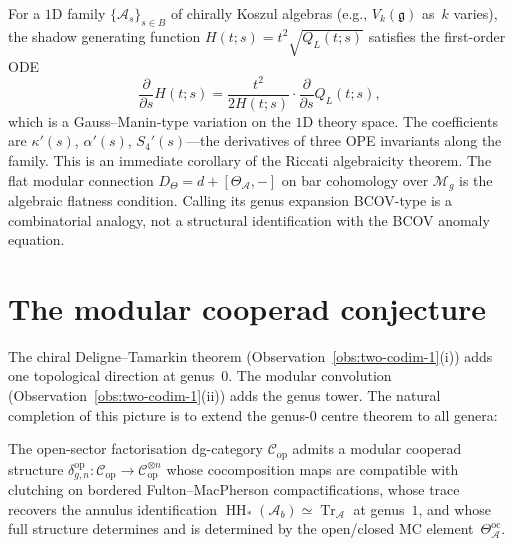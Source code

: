 \documentclass[11pt]{article}
\newcommand{\cA}{\mathcal{A}}
\newcommand{\cC}{\mathcal{C}}
\newcommand{\cM}{\mathcal{M}}
\newcommand{\fg}{\mathfrak{g}}
\newcommand{\HH}{\operatorname{HH}}
\newcommand{\Tr}{\operatorname{Tr}}
\begin{document}
\begin{observation}
\label{obs:gauss-manin-variation}
For a $1$D family $\{\cA_s\}_{s \in B}$ of chirally Koszul
algebras (e.g., $V_k(\fg)$ as~$k$ varies), the shadow generating
function $H(t;s) = t^2\sqrt{Q_L(t;s)}$ satisfies the first-order
ODE
\[
\frac{\partial}{\partial s} H(t;s)
= \frac{t^2}{2H(t;s)} \cdot
  \frac{\partial}{\partial s} Q_L(t;s),
\]
which is a Gauss--Manin-type variation on the $1$D theory space.
The coefficients are $\kappa'(s)$, $\alpha'(s)$, $S_4'(s)$---the
derivatives of three OPE invariants along the family.  This is an
immediate corollary of the Riccati algebraicity theorem.  The flat
modular connection $D_\Theta = d + [\Theta_\cA, -]$ on bar
cohomology over $\cM_g$ is the algebraic flatness condition.
Calling its genus expansion BCOV-type is a combinatorial analogy,
not a structural identification with the BCOV anomaly equation.
\end{observation}


\section{The modular cooperad conjecture}
\label{sec:modular-cooperad}

The chiral Deligne--Tamarkin theorem (Observation~\ref{obs:two-codim-1}(i))
adds one topological direction at genus~$0$.  The modular convolution
(Observation~\ref{obs:two-codim-1}(ii)) adds the genus tower.  The
natural completion of this picture is to extend the genus-$0$ centre
theorem to all genera:

\begin{conjecture}
\label{conj:ct2}
The open-sector factorisation dg-category $\cC_{\mathrm{op}}$ admits
a modular cooperad structure
$\delta_{g,n}^{\mathrm{op}}: \cC_{\mathrm{op}}
\to \cC_{\mathrm{op}}^{\otimes n}$
whose cocomposition maps are compatible with clutching on bordered
Fulton--MacPherson compactifications, whose trace recovers the
annulus identification $\HH_*(\cA_b) \simeq \Tr_\cA$ at genus~$1$,
and whose full structure determines and is determined by the
open/closed MC element~$\Theta^{\mathrm{oc}}_\cA$.
\end{conjecture}
\end{document}
